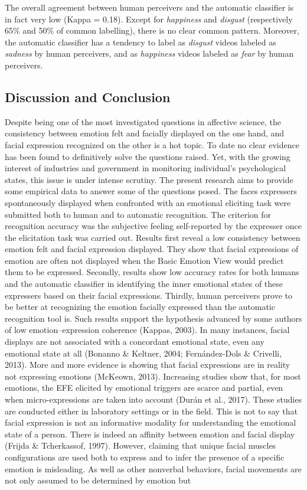 \documentclass[
  english,
  man]{apa7}
\begin{document}
The overall agreement between human perceivers and the automatic classifier is in fact very low (Kappa = 0.18). Except for \emph{happiness} and \emph{disgust} (respectively 65\% and 50\% of common labelling), there is no clear common pattern. Moreover, the automatic classifier has a tendency to label as \emph{disgust} videos labeled as \emph{sadness} by human perceivers, and as \emph{happiness} videos labeled as \emph{fear} by human perceivers.

\hypertarget{discussion-and-conclusion}{%
\subsection{Discussion and Conclusion}\label{discussion-and-conclusion}}

Despite being one of the most investigated questions in affective science, the consistency between emotion felt and facially displayed on the one hand, and facial expression recognized on the other is a hot topic. To date no clear evidence has been found to definitively solve the questions raised. Yet, with the growing interest of industries and government in monitoring individual's psychological states, this issue is under intense scrutiny. The present research aims to provide some empirical data to answer some of the questions posed. The faces expressers spontaneously displayed when confronted with an emotional eliciting task were submitted both to human and to automatic recognition. The criterion for recognition accuracy was the subjective feeling self-reported by the expresser once the elicitation task was carried out. Results first reveal a low consistency between emotion felt and facial expression displayed. They show that facial expressions of emotion are often not displayed when the Basic Emotion View would predict them to be expressed. Secondly, results show low accuracy rates for both humans and the automatic classifier in identifying the inner emotional states of these expressers based on their facial expressions. Thirdly, human perceivers prove to be better at recognizing the emotion facially expressed than the automatic recognition tool is. Such results support the hypothesis advanced by some authors of low emotion--expression coherence (Kappas, 2003). In many instances, facial displays are not associated with a concordant emotional state, even any emotional state at all (Bonanno \& Keltner, 2004; Fernández-Dols \& Crivelli, 2013). More and more evidence is showing that facial expressions are in reality not expressing emotions (McKeown, 2013). Increasing studies show that, for most emotions, the EFE elicited by emotional triggers are scarce and partial, even when micro-expressions are taken into account (Durán et al., 2017). These studies are conducted either in laboratory settings or in the field. This is not to say that facial expression is not an informative modality for understanding the emotional state of a person. There is indeed an affinity between emotion and facial display (Frijda \& Tcherkassof, 1997). However, claiming that unique facial muscles configurations are used both to express and to infer the presence of a specific emotion is misleading. As well as other nonverbal behaviors, facial movements are not only assumed to be determined by emotion but 
\end{document}
